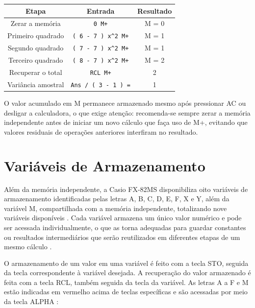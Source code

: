 \begin{table}[H]
    \centering
    \begin{tabular}{|c|c|c|}
        \hline
        \textbf{Etapa} & \textbf{Entrada} & \textbf{Resultado} \\ \hline
            Zerar a memória & \texttt{0 M+} & M = 0 \\
            Primeiro quadrado & \texttt{( 6 - 7 ) x\textasciicircum{}2 M+} & M = 1 \\
            Segundo quadrado & \texttt{( 7 - 7 ) x\textasciicircum{}2 M+} & M = 1 \\
            Terceiro quadrado & \texttt{( 8 - 7 ) x\textasciicircum{}2 M+} & M = 2 \\
            Recuperar o total & \texttt{RCL M+} & 2 \\
            Variância amostral & \texttt{Ans / ( 3 - 1 ) =} & 1 \\ \hline
        \end{tabular}
\end{table}

O valor acumulado em M permanece armazenado mesmo após pressionar AC ou desligar a calculadora, o que exige atenção: recomenda-se sempre zerar a memória independente antes de iniciar um novo cálculo que faça uso de M+, evitando que valores residuais de operações anteriores interfiram no resultado.

\section{Variáveis de Armazenamento}

Além da memória independente, a Casio FX-82MS disponibiliza oito variáveis de armazenamento identificadas pelas letras A, B, C, D, E, F, X e Y, além da variável M, compartilhada com a memória independente, totalizando nove variáveis disponíveis \cite{casio2004}. Cada variável armazena um único valor numérico e pode ser acessada individualmente, o que as torna adequadas para guardar constantes ou resultados intermediários que serão reutilizados em diferentes etapas de um mesmo cálculo \cite{casio2004}.

O armazenamento de um valor em uma variável é feito com a tecla STO, seguida da tecla correspondente à variável desejada. A recuperação do valor armazenado é feita com a tecla RCL, também seguida da tecla da variável. As letras A a F e M estão indicadas em vermelho acima de teclas específicas e são acessadas por meio da tecla ALPHA \cite{casio2004}:

